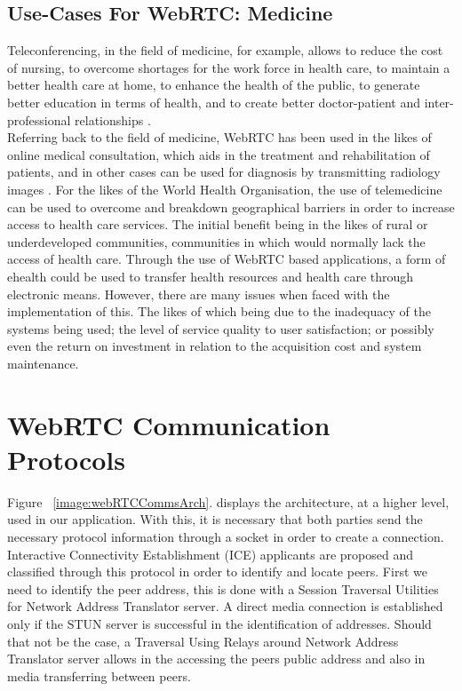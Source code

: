 \subsection{Use-Cases For WebRTC: Medicine}
Teleconferencing, in the field of medicine, for example, allows to reduce the cost of nursing, to overcome shortages for the work force in health care, to maintain a better health care at home, to enhance the health of the public, to generate better education in terms of health, and to create better doctor-patient and inter-professional relationships \cite{14003034520191201}. 
\\Referring back to the field of medicine, WebRTC has been used in the likes of online medical consultation, which aids in the treatment and rehabilitation of patients, and in other cases can be used for diagnosis by transmitting radiology images \cite{14003034520191201}. For the likes of the World Health Organisation, the use of telemedicine can be used to overcome and breakdown geographical barriers in order to increase access to health care services. The initial benefit being in the likes of rural or underdeveloped communities, communities in which would normally lack the access of health care. Through the use of WebRTC based applications, a form of ehealth could be used to transfer health resources and health care through electronic means. However, there are many issues when faced with the implementation of this. The likes of which being due to the inadequacy of the systems being used; the level of service quality to user satisfaction; or possibly even the return on investment in relation to the acquisition cost and system maintenance. \cite{S187705091632345620160101}

\section{WebRTC Communication Protocols}
Figure ~\ref{image:webRTCCommsArch}. displays the architecture, at a higher level, used in our application. With this, it is necessary that both parties send the necessary protocol information through a socket in order to create a connection. Interactive Connectivity Establishment (ICE) applicants are proposed and classified through this protocol in order to identify and locate peers. First we need to identify the peer address, this is done with a Session Traversal Utilities for Network Address Translator server. A direct media connection is established only if the STUN server is successful in the identification of addresses. Should that not be the case, a Traversal Using Relays around Network Address Translator server allows in the accessing the peers public address and also in media transferring between peers\cite{14003034520191201}.

